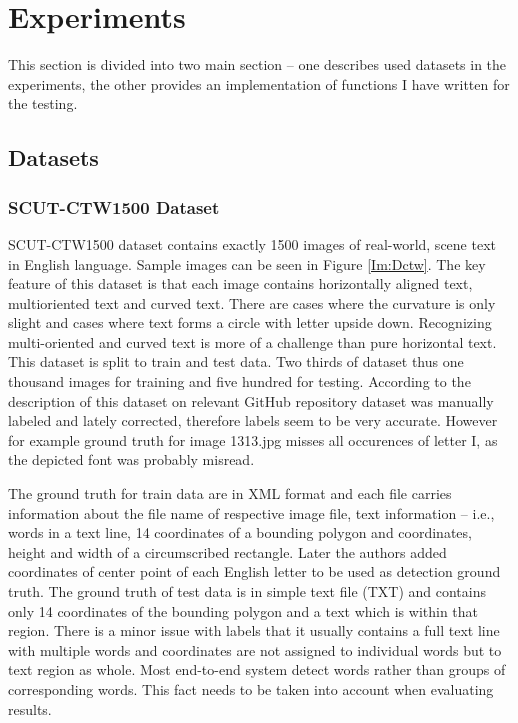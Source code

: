 \chapter{Experiments}
\label{ch:testing}

This section is divided into two main section -- one describes used datasets in the experiments, the other provides an implementation of functions I have written for the testing.

\section{Datasets}
\label{sec:expDatasets}

\subsection*{SCUT-CTW1500 Dataset}

SCUT-CTW1500 dataset contains exactly 1500 images of real-world, scene text in English language. Sample images can be seen in Figure \ref*{Im:Dctw}. The key feature of this dataset is that each image contains horizontally aligned text, multioriented text and curved text. There are cases where the curvature is only slight and cases where text forms a circle with letter upside down. Recognizing multi-oriented and curved text is more of a challenge than pure horizontal text. This dataset is split to train and test data. Two thirds of dataset thus one thousand images for training and five hundred for testing. According to the description of this dataset on relevant GitHub repository dataset was manually labeled and lately corrected, therefore labels seem to be very accurate. However for example ground truth for image 1313.jpg misses all occurences of letter I, as the depicted font was probably misread.\cite{ctw,ctw2}

The ground truth for train data are in XML format and each file carries information about the file name of respective image file, text information -- i.e., words in a text line, 14 coordinates of a bounding polygon and coordinates, height and width of a circumscribed rectangle. Later the authors added coordinates of center point of each English letter to be used as detection ground truth. The ground truth of test data is in simple text file (TXT) and contains only 14 coordinates of the bounding polygon and a text which is within that region. There is a minor issue with labels that it usually contains a full text line with multiple words and coordinates are not assigned to individual words but to text region as whole. Most end-to-end system detect words rather than groups of corresponding words. This fact needs to be taken into account when evaluating results.

